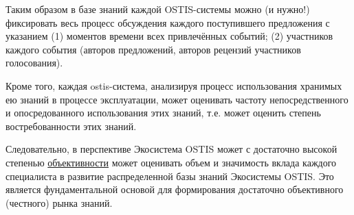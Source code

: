 {Таким образом в базе знаний каждой OSTIS-системы можно (и нужно!)
фиксировать весь процесс обсуждения каждого поступившего предложения с
указанием (1) моментов времени всех привлечённых событий; (2) участников каждого события (авторов предложений, авторов рецензий участников голосования).

Кроме того, каждая ostis-система, анализируя процесс использования
хранимых ею знаний в процессе эксплуатации, может оценивать частоту
непосредственного и опосредованного использования этих знаний, т.е. может оценить степень востребованности этих знаний.	

Следовательно, в перспективе Экосистема OSTIS может с достаточно
высокой степенью \uline{объективности} может оценивать объем и значимость вклада каждого специалиста в развитие распределенной базы знаний Экосистемы OSTIS. Это является фундаментальной основой для
формирования достаточно объективного (честного) рынка знаний.}

